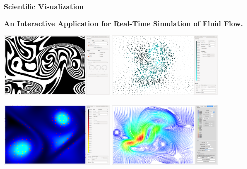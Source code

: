
\hypersetup{pageanchor=false}
\begin{titlepage}
    \centering
    \par\vspace{9cm}
          
    \par\vspace{3cm}
    {\huge\bfseries  Scientific Visualization \par}
    {\large\bfseries  An Interactive Application for Real-Time Simulation of Fluid Flow.\par}

    \vspace{1cm}\par
        \includegraphics[width=0.42\textwidth, trim={35px 30px 430px 30px}, clip]{img/titlepage/zebra.png} \hspace{30px}
        \includegraphics[width=0.42\textwidth, trim={35px 30px 430px 30px}, clip]{img/titlepage/glyphs2.png}

        \vspace{40px}
        \includegraphics[width=0.42\textwidth, trim={35px 30px 430px 30px}, clip]{img/titlepage/gradient.png} \hspace{30px}
        \includegraphics[width=0.42\textwidth, trim={35px 30px 430px 30px}, clip]{img/titlepage/streamlines.png}


\end{titlepage}
